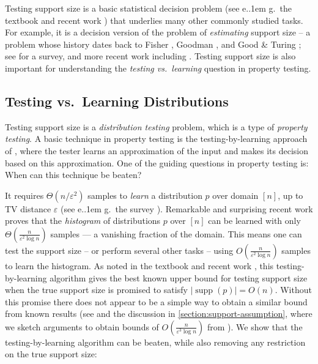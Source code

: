 \documentclass[10pt,a4paper]{article}
\newcommand*\eg{e.\kern.1em g.\ }
\DeclareMathOperator{\supp}{supp}   %
\renewcommand{\epsilon}{\varepsilon}
\begin{document}
Testing support size is a basic statistical decision problem (see \eg the textbook \cite[\S 11.4]{Gol17} and
recent work \cite{GR23,AF24,AFL24,KLR25}) that underlies many other commonly studied tasks.  For example,
it is a decision version of the problem of \emph{estimating} support size -- a problem whose history
dates back to Fisher \cite{FCW43}, Goodman \cite{Goodman49}, and Good \& Turing \cite{Good53}; see
\cite{BF93} for a survey, and more recent work including \cite{RRSS09,VV11stoc,VV17,WY19,HO19}.
Testing support size is also
important for understanding the \emph{testing vs.~learning} question in property testing.

\subsection{Testing \texorpdfstring{vs.~Learning Distributions}{vs. Learning Distributions}}

Testing support size is a \emph{distribution testing} problem, which
is a type of \emph{property testing}.  A basic technique in property testing is
the testing-by-learning approach of \cite{GGR98}, where the tester learns an approximation of
the input and makes its decision based on this approximation. One of the guiding questions in
property testing is: When can this technique be beaten?

It requires $\Theta(n/\epsilon^2)$ samples to \emph{learn} a distribution $p$ over domain $[n]$, up
to TV distance $\epsilon$ (see \eg the survey \cite{Can20}). Remarkable and surprising recent work
\cite{VV11stoc,VV17,HJW18,HO19pml} proves that the \emph{histogram} of distributions $p$ over $[n]$
can be learned with only $\Theta(\tfrac{n}{\epsilon^2 \log n})$ samples --- a vanishing fraction of
the domain. This means one can test the support size -- or perform several other tasks -- using
$O(\tfrac{n}{\epsilon^2 \log n})$ samples to learn the histogram.  As noted in the textbook
\cite{Gol17} and recent work \cite{GR23,AFL24}, this testing-by-learning algorithm gives the best
known upper bound for testing support size when the true support size is promised to satisfy
$|\supp(p)| = O(n)$. Without this promise there does not appear to be a simple way to obtain a
similar bound from known results (see \cite[pp.21]{GR23} and the discussion in
\cref{section:support-assumption}, where we sketch arguments to obtain bounds of
$O(\tfrac{n}{\epsilon^3 \log n})$ from \cite{VV16}). We show that the testing-by-learning algorithm
can be beaten, while also removing any restriction on the true support size:
\end{document}
